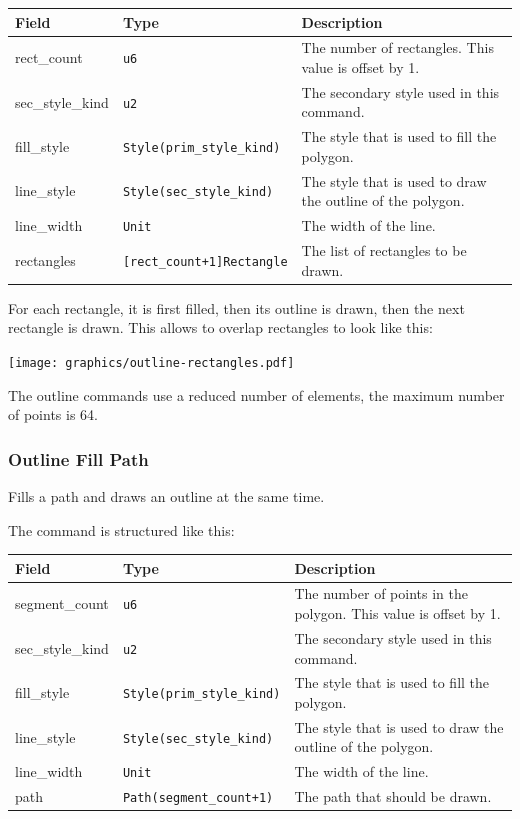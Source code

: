 \documentclass[]{article}
\begin{document}
\begin{longtable}[]{@{}p{1in}p{2.2in}p{2.8in}@{}}
\toprule
Field & Type & Description \\
\midrule
\endhead
rect\_count & \texttt{u6}                                & The number of rectangles. This value is offset by 1. \\
sec\_style\_kind & \texttt{u2}                           & The secondary style used in this command. \\
fill\_style      & \texttt{Style(prim\_style\_kind)}     & The style that is used to fill the polygon. \\
line\_style      & \texttt{Style(sec\_style\_kind)}      & The style that is used to draw the outline of the polygon. \\
line\_width      & \texttt{Unit}                         & The width of the line. \\
rectangles       & \texttt{{[}rect\_count+1{]}Rectangle} & The list of rectangles to be drawn. \\
\bottomrule
\end{longtable}

For each rectangle, it is first filled, then its outline is drawn, then
the next rectangle is drawn. This allows to overlap rectangles to look
like this:

\begin{center}
\texttt{[image: graphics/outline-rectangles.pdf]}
\end{center}

The outline commands use a reduced number of elements, the maximum
number of points is 64.

\hypertarget{outline-fill-path}{\subsubsection{Outline Fill Path}\label{outline-fill-path}}

Fills a path and draws an outline at the same time.

The command is structured like this:

\begin{longtable}[]{@{}p{1in}p{1.6in}p{3.4in}@{}}
\toprule
Field & Type & Description \\
\midrule
\endhead
segment\_count   & \texttt{u6}                       & The number of points in the polygon. This value is offset by 1. \\
sec\_style\_kind & \texttt{u2}                       & The secondary style used in this command. \\
fill\_style      & \texttt{Style(prim\_style\_kind)} & The style that is used to fill the polygon. \\
line\_style      & \texttt{Style(sec\_style\_kind)}  & The style that is used to draw the outline of the polygon. \\
line\_width      & \texttt{Unit}                     & The width of the line. \\
path             & \texttt{Path(segment\_count+1)}   & The path that should be drawn. \\
\bottomrule
\end{longtable}
\end{document}
